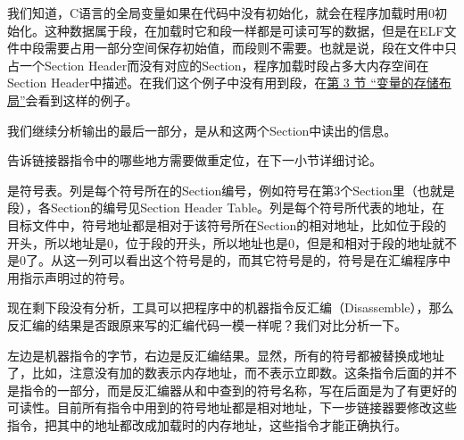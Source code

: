 我们知道，C语言的全局变量如果在代码中没有初始化，就会在程序加载时用0初始化。这种数据属于段，在加载时它和段一样都是可读可写的数据，但是在ELF文件中段需要占用一部分空间保存初始值，而段则不需要。也就是说，段在文件中只占一个Section Header而没有对应的Section，程序加载时段占多大内存空间在Section Header中描述。在我们这个例子中没有用到段，在\hyperlink{db.ch19s03.id2777491}{第 3 节 “变量的存储布局”}会看到这样的例子。



我们继续分析输出的最后一部分，是从和这两个Section中读出的信息。




告诉链接器指令中的哪些地方需要做重定位，在下一小节详细讨论。



是符号表。列是每个符号所在的Section编号，例如符号在第3个Section里（也就是段），各Section的编号见Section Header Table。列是每个符号所代表的地址，在目标文件中，符号地址都是相对于该符号所在Section的相对地址，比如位于段的开头，所以地址是0，位于段的开头，所以地址也是0，但是和相对于段的地址就不是0了。从这一列可以看出这个符号是的，而其它符号是的，符号是在汇编程序中用指示声明过的符号。



现在剩下段没有分析，工具可以把程序中的机器指令反汇编（Disassemble），那么反汇编的结果是否跟原来写的汇编代码一模一样呢？我们对比分析一下。




左边是机器指令的字节，右边是反汇编结果。显然，所有的符号都被替换成地址了，比如，注意没有加\BookCode{\$}的数表示内存地址，而不表示立即数。这条指令后面的并不是指令的一部分，而是反汇编器从和中查到的符号名称，写在后面是为了有更好的可读性。目前所有指令中用到的符号地址都是相对地址，下一步链接器要修改这些指令，把其中的地址都改成加载时的内存地址，这些指令才能正确执行。


